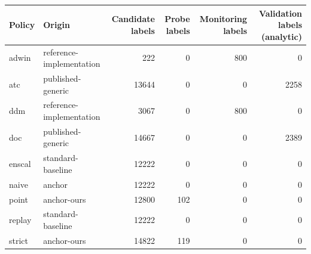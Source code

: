 \begin{table}[t]
\medskip
\begin{tabular}{l l r r r r}
\toprule
Policy & Origin & Candidate labels & Probe labels & Monitoring labels & Validation labels (analytic) \\
\midrule
adwin & reference-implementation & 222 & 0 & 800 & 0 \\
atc & published-generic & 13644 & 0 & 0 & 2258 \\
ddm & reference-implementation & 3067 & 0 & 800 & 0 \\
doc & published-generic & 14667 & 0 & 0 & 2389 \\
enscal & standard-baseline & 12222 & 0 & 0 & 0 \\
naive & anchor & 12222 & 0 & 0 & 0 \\
point & anchor-ours & 12800 & 102 & 0 & 0 \\
replay & standard-baseline & 12222 & 0 & 0 & 0 \\
strict & anchor-ours & 14822 & 119 & 0 & 0 \\
\bottomrule
\end{tabular}
\end{table}
